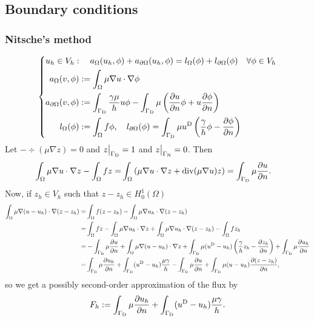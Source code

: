 %
\subsection{Boundary conditions}\label{subsec:}
%
%
\subsubsection{Nitsche's method}
%
%
\begin{equation}\label{eq:laplace:weakform}
%
\left\{
\begin{aligned}
&u_h\in V_h:\quad a_{\Omega}(u_h, \phi) + a_{\partial\Omega}(u_h,\phi) = l_{\Omega}(\phi)+l_{\partial\Omega}(\phi) \quad\forall \phi\in V_h\\
&\begin{aligned}
a_{\Omega}(v,\phi) &:= \int_{\Omega} \mu \nabla u\cdot\nabla\phi \\
 a_{\partial\Omega}(v,\phi) &:= \int_{\GammaD}\frac{\gamma\mu}{h}u\phi - 
 \int_{\GammaD}\mu \left(  \dn{u} \phi + u  \dn{\phi}\right) \\
 l_{\Omega}(\phi) &:= \int_{\Omega} f\phi, \quad
 l_{\partial\Omega}(\phi) = \int_{\GammaD}\mu\uD\left( \frac{\gamma}{h}\phi - \dn{\phi}\right)
\end{aligned}
\end{aligned}
\right.
%
\end{equation}
%
Let $-\div(\mu \nabla z)= 0$ and $\Rest{z}{\GammaD}=1$ and $\Rest{z}{\GammaN}=0$. Then
%
\begin{align*}
\int_{\Omega} \mu \nabla u\cdot\nabla z -\int_{\Omega} fz =&  \int_{\Omega} \left( \mu \nabla u\cdot\nabla z + \operatorname{div}(\mu \nabla u)z\right) 
= \int_{\Gamma_{\rm D}}\mu\frac{\partial u}{\partial n}.
\end{align*}
%
Now, if $z_h\in V_h$ such that $z-z_h\in H^1_0(\Omega)$ 
%
\begin{align*}
\int_{\Omega} \mu \nabla (u-u_h)\cdot\nabla(z-z_h) =& \int_{\Omega} f(z-z_h) -\int_{\Omega} \mu \nabla u_h\cdot\nabla(z-z_h)\\
=&\int_{\Omega} fz - \int_{\Omega} \mu \nabla u_h\cdot\nabla z + \int_{\Omega} \mu \nabla u_h\cdot\nabla(z-z_h) -\int_{\Omega} fz_h\\
=&-\int_{\Gamma_{\rm D}}\mu\frac{\partial u}{\partial n}+ \int_{\Omega} \mu \nabla (u-u_h)\cdot\nabla z 
+ \int_{\Gamma_{\rm D}}\mu(u^{\rm D}-u_h)\left( \frac{\gamma}{h}z_h - \frac{\partial z_h}{\partial n}\right)+ \int_{\Gamma_{\rm D}}\mu \frac{\partial u_h}{\partial n}\\
=&\int_{\Gamma_{\rm D}}\mu \frac{\partial u_h}{\partial n}+ \int_{\Gamma_{\rm D}}(u^{\rm D}-u_h)\frac{\mu\gamma}{h} -\int_{\Gamma_{\rm D}}\mu\frac{\partial u}{\partial n}
+ \int_{\Gamma_{\rm D}}\mu(u-u_h) \frac{\partial (z-z_h)}{\partial n},
\end{align*}
%
so we get a possibly second-order approximation of the flux by
%
\begin{equation}\label{eq:}
F_h := \int_{\Gamma_{\rm D}}\mu \frac{\partial u_h}{\partial n}+ \int_{\Gamma_{\rm D}}(u^{\rm D}-u_h)\frac{\mu\gamma}{h}.
\end{equation}
%
%
